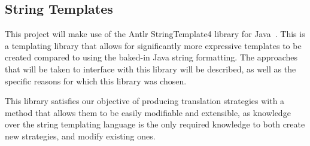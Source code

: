 \documentclass{entcs}
\begin{document}
\subsection{String Templates}\label{section:string_templates_bg}

This project will make use of the Antlr StringTemplate4 library for Java~\cite{ST4}. This is a templating library that allows for significantly more expressive templates to be created compared to using the baked-in Java string formatting. The approaches that will be taken to interface with this library will be described, as well as the specific reasons for which this library was chosen. 

This library satisfies our objective of producing translation strategies with a method that allows them to be easily modifiable and extensible, as knowledge over the string templating language is the only required knowledge to both create new strategies, and modify existing ones.
\end{document}
